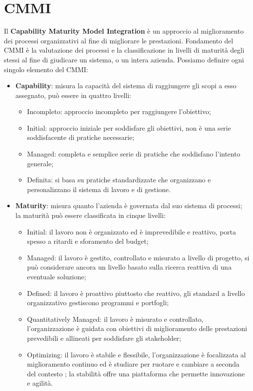 \section{CMMI}
Il \textbf{Capability Maturity Model Integration} è un approccio al miglioramento dei processi organizzativi al fine di migliorare le prestazioni. Fondamento del CMMI è la valutazione dei processi e la classificazione in livelli di maturità degli stessi al fine di giudicare un sistema, o un intera azienda. Possiamo definire ogni singolo elemento del CMMI:
\begin{itemize}
	\item \textbf{Capability}: misura la capacità del sistema di raggiungere gli scopi a esso assegnato, può essere  in quattro livelli:
	\begin{itemize}
		\item Incompleto: approccio incompleto per raggiungere l'obiettivo;
		\item Initial: approccio iniziale per soddisfare gli obiettivi, non è una serie soddisfacente di pratiche necessarie;
		\item Managed: completa e semplice serie di pratiche che soddisfano l'intento generale;
		\item Definita: si basa su pratiche standardizzate che organizzano e personalizzano il sistema di lavoro e di gestione.
	\end{itemize}	 
	\item \textbf{Maturity}: misura quanto l'azienda è governata dal suo sistema di processi; la maturità può essere classificata in cinque livelli:
	\begin{itemize}
		\item Initial: il lavoro non è organizzato ed è imprevedibile e reattivo, porta spesso a ritardi e sforamento del budget;
		\item Managed: il lavoro è gestito, controllato e misurato a livello di progetto, si può considerare ancora un livello basato sulla ricerca reattiva di una eventuale soluzione;
		\item Defined: il lavoro è proattivo piuttosto che reattivo, gli standard a livello organizzativo gestiscono programmi e portfogli;
		\item Quantitatively Managed: il lavoro è misurato e controllato, l'organizzazione è guidata con obiettivi di miglioramento delle prestazioni prevedibili e allineati per soddisfare gli stakeholder;
		\item Optimizing: il lavoro è stabile e flessibile, l'organizzazione è focalizzata al miglioramento continuo ed è studiare per ruotare e cambiare a seconda del contesto ; la stabilità offre una piattaforma che permette innovazione e agilità.

\end{itemize}
\end{itemize}
